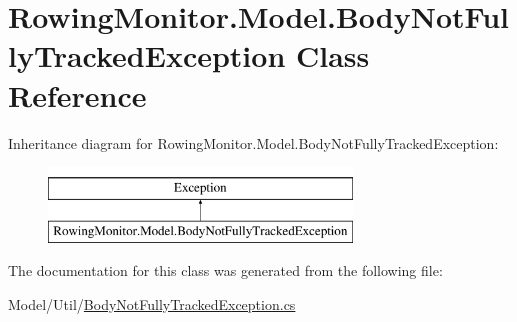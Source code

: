 \hypertarget{class_rowing_monitor_1_1_model_1_1_body_not_fully_tracked_exception}{}\section{Rowing\+Monitor.\+Model.\+Body\+Not\+Fully\+Tracked\+Exception Class Reference}
\label{class_rowing_monitor_1_1_model_1_1_body_not_fully_tracked_exception}
Inheritance diagram for Rowing\+Monitor.\+Model.\+Body\+Not\+Fully\+Tracked\+Exception\+:\begin{figure}[H]
\begin{center}
\leavevmode
\includegraphics[height=2.000000cm]{class_rowing_monitor_1_1_model_1_1_body_not_fully_tracked_exception}
\end{center}
\end{figure}


The documentation for this class was generated from the following file\+:\begin{DoxyCompactItemize}
\item 
Model/\+Util/\hyperlink{_body_not_fully_tracked_exception_8cs}{Body\+Not\+Fully\+Tracked\+Exception.\+cs}\end{DoxyCompactItemize}
